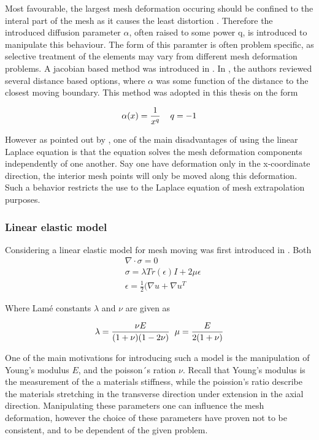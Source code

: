 Most favourable, the largest mesh deformation occuring should be confined to the interal part of the mesh as it causes the least distortion \cite{Jasak2006}. Therefore the introduced diffusion parameter $\alpha$, often raised to some power q, is introduced to manipulate this behaviour. The form of this paramter is often problem specific,  as selective treatment of the elements may vary from different mesh deformation problems. A jacobian based method was introduced in \cite{Stein}. In \cite{Jasak2006}, the authors reviewed several distance based options, where $\alpha$ was some function of the distance to the closest moving boundary. This method was adopted in this thesis on the form

\begin{align*}
\alpha(x) = \frac{1}{x^q}  \hspace{4mm} q = -1
\end{align*}

However as pointed out by \cite{Hsu}, one of the main disadvantages of using the linear Laplace equation is that the equation solves the mesh deformation components independently of one another. Say one have deformation only in the x-coordinate direction, the interior mesh points will only be moved along this deformation. Such a behavior restricts the use to the Laplace equation of mesh extrapolation purposes.

\subsubsection*{Linear elastic model}
Considering a linear elastic model for mesh moving was first introduced in \cite{Tezduyar1992}.  
Both \cite{Dwight}
\begin{align*}
&\nabla \cdot \sigma = 0 \\
&\sigma = \lambda Tr(\epsilon) I + 2 \mu \epsilon \\
&\epsilon = \frac{1}{2}(\nabla u + \nabla u^T
\end{align*}

Where Lamé constants $\lambda$ and $\nu$ are given as

\begin{align*}
\lambda = \frac{\nu E}{(1 + \nu)(1 - 2\nu)} \hspace{2mm} \mu = \frac{E}{2(1 + \nu)}
\end{align*}

One of the main motivations for introducing such a model is the manipulation of Young's modulus $E$, and the poisson´s ration $\nu$. Recall that Young's modulus is the measurement of the a materials stiffness, while the poission's ratio describe the materials stretching in the transverse direction under extension in the axial direction. Manipulating these parameters one can influence the mesh deformation,
however the choice of these parameters have proven not to be consistent,  and to be dependent of the given problem.  \\

